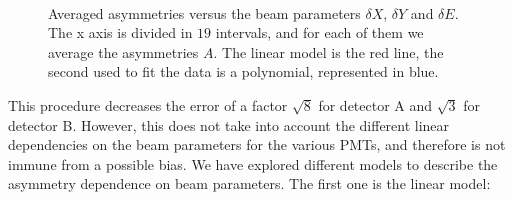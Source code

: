\begin{figure}[!ht]
\centering
{}
\\
\caption{Averaged asymmetries versus the beam parameters $\delta X$, $\delta Y$ and $\delta E$. The x axis is divided in $19$ intervals, and for each of them we average the asymmetries $A$. The linear model is the red line, the second used to fit the data is a polynomial, represented in blue. }
\label{fig:DifferentModels}
\end{figure}

 This procedure decreases the error of a factor $\sqrt{8}$ for detector A and $\sqrt{3}$ for detector B. However, this does not take into account the different linear dependencies on the beam parameters for the various PMTs, and therefore is not immune from a possible bias. 
We have explored different models to describe the asymmetry dependence on beam parameters. The first one is the linear model: 


